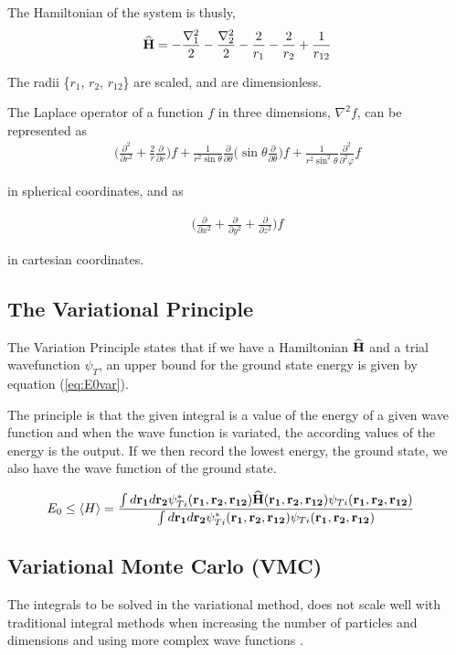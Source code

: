 \documentclass[twocolumn]{article}[10pt]
\newcommand{\eq}[1]{\begin{align*}#1\end{align*}}
\newcommand{\equ}[1]{\begin{align}#1\end{align}}
\newcommand{\OP}[1]{{\bf\widehat{#1}}}
\begin{document}
The Hamiltonian of the system is thusly, 
{\small
\eq{
    \OP H = -\frac{\nabla_1 ^2}{2} -\frac{\nabla_2 ^2}{2}
    -\frac{2}{r_1}-\frac{2}{r_2}+\frac{1}{r_{12}}
}}%

The radii \{$r_1$, $r_2$, $r_{12}$\} are scaled, and are dimensionless.

The Laplace operator of a function $f$ in three dimensions, $\nabla^2 f$,
can be represented as
{\small
\eq{
  \bigg( \frac{\partial^2}{\partial r^2} 
    + \frac{2}{r} \frac{\partial}{\partial r} \bigg) f
    +\frac{1}{r^2 \sin\theta}\frac{\partial}{\partial \theta}
    \bigg( \sin\theta \frac{\partial}{\partial \theta}  \bigg) f
    +\frac{1}{r^2 \sin^2\theta}\frac{\partial^2}{\partial^2 \varphi} f
}}%

in spherical coordinates, and as

{\small
\eq{
	\bigg( 
	\frac{\partial}{\partial x^2} +
	\frac{\partial}{\partial y^2} +
	\frac{\partial}{\partial z^2}
	\bigg) f
}}%

in cartesian coordinates.

\subsection{The Variational Principle}
The Variation Principle states that if we have a Hamiltonian
$\OP H$ and a trial wavefunction $\psi_{T}$,
an upper bound for the ground state energy is given by
equation (\ref{eq:E0var}). 

The principle is that the given integral is a
value of the energy of a given wave function and when the wave function
is variated, the according values of the energy is the output. If we then
record the lowest energy, the ground state, we also have the wave function
of the ground state. 
\begin{strip}
{
\equ{
	&E_0 \leq
	\langle H \rangle =
	\frac{\int d{\bf r_1}d{\bf r_2}\psi^{\ast}_{Ti}({\bf r_1},{\bf r_2}, 
	{\bf r_{12}})
	\OP{H}({\bf r_1},{\bf r_2}, {\bf r_{12}})
	\psi_{Ti}({\bf r_1},{\bf r_2}, {\bf r_{12}})}
	{\int d{\bf r_1}d{\bf r_2}\psi^{\ast}_{Ti}({\bf r_1},{\bf r_2}, {\bf r_{12}})
	\psi_{Ti}({\bf r_1},{\bf r_2}, {\bf r_{12}})}\label{eq:E0var}
}}%
\end{strip}


\subsection{Variational Monte Carlo (VMC)}
The integrals to be solved in the variational method,
does not scale well with traditional integral methods when 
increasing the number of particles and dimensions and using 
more complex wave functions .
\end{document}
